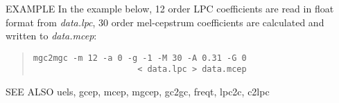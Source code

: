 \begin{qsection}{EXAMPLE}
In the example below, 12 order LPC coefficients are read in
float format from {\em data.lpc}, 30 order mel-cepstrum
coefficients are calculated and written to {\em data.mcep}:
\begin{quote}
 \verb!mgc2mgc -m 12 -a 0 -g -1 -M 30 -A 0.31 -G 0!\\
 \verb!                     < data.lpc > data.mcep!
\end{quote} 
\end{qsection}

\begin{qsection}{SEE ALSO}
 uels, gcep, mcep, mgcep, gc2gc, freqt, lpc2c, c2lpc
\end{qsection}
